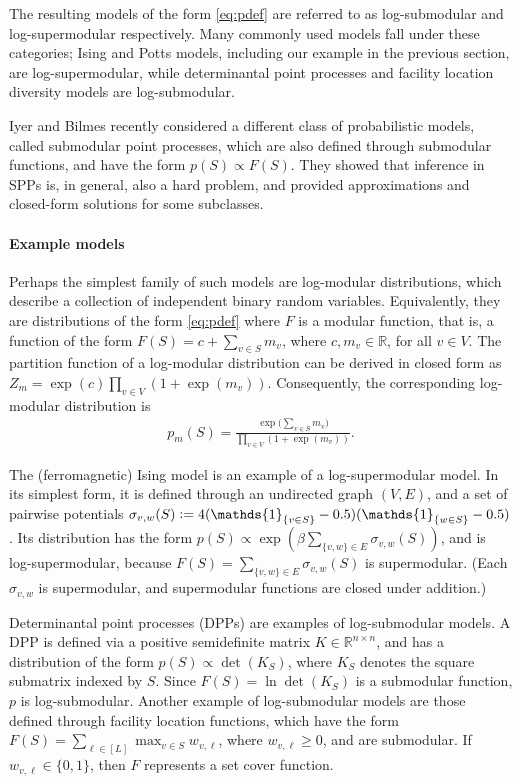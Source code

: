 The resulting models of the form \eqref{eq:pdef} are referred to as log-submodular and log-supermodular respectively.
Many commonly used models fall under these categories; Ising and Potts models, including our example in the previous section, are log-supermodular, while determinantal point processes and facility location diversity models are log-submodular.

Iyer and Bilmes \citep{iyer15} recently considered a different class of probabilistic models, called submodular point processes, which are also defined through submodular functions, and have the form $p(S) \propto F(S)$.
They showed that inference in SPPs is, in general, also a hard problem, and provided approximations and closed-form solutions for some subclasses.



\paragraph{Example models}
Perhaps the simplest family of such models are log-modular distributions, which describe a collection of independent binary random variables.
Equivalently, they are distributions of the form \eqref{eq:pdef} where $F$ is a modular function, that is, a function of the form $F(S) = c + \sum_{v \in S}m_v$, where $c, m_v \in \mathbb{R}$, for all $v \in V$.
The partition function of a log-modular distribution can be derived in closed form as $Z_m = \exp(c) \prod_{v \in V} \left( 1 + \exp(m_v) \right)$.
Consequently, the corresponding log-modular distribution is
\begin{align*}
  p_m(S) = \frac{\exp\big( \sum_{v \in S} m_v \big)}{\prod_{v \in V} \left( 1 + \exp(m_v) \right)}.
\end{align*}

The (ferromagnetic) Ising model is an example of a log-supermodular model.
In its simplest form, it is defined through an undirected graph $(V, E)$, and a set of pairwise potentials $\sigma_{v,w}(S) \defeq 4(\mathds{1}_{\{v \in S\}}-0.5)(\mathds{1}_{\{w \in S\}}-0.5)$.
Its distribution has the form $p(S) \propto \exp(\beta\sum_{\{v,w\} \in E} \sigma_{v,w}(S))$, and is log-supermodular, because $F(S) = \sum_{\{v,w\} \in E} \sigma_{v,w}(S)$ is supermodular. (Each $\sigma_{v,w}$ is supermodular, and supermodular functions are closed under addition.)

Determinantal point processes (DPPs) are examples of log-submodular models.
A DPP is defined via a positive semidefinite matrix $K \in \mathbb{R}^{n \times n}$, and has a distribution of the form $p(S) \propto \det(K_S)$, where $K_S$ denotes the square submatrix indexed by $S$.
Since $F(S) = \ln \det(K_S)$ is a submodular function, $p$ is log-submodular.
Another example of log-submodular models are those defined through facility location functions, which have the form $F(S) = \sum_{\ell \in [L]} \max_{v \in S}w_{v,\ell}$, where $w_{v,\ell} \geq 0$, and are submodular.
If $w_{v,\ell} \in \{0, 1\}$, then $F$ represents a set cover function.

